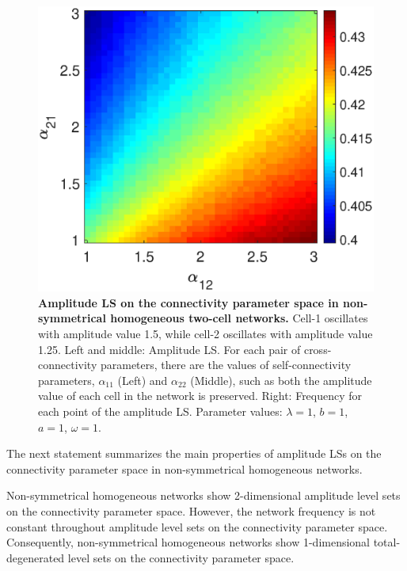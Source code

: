 \begin{figure}[h]
\begin{minipage}{0.32\linewidth}
  \end{minipage} 
   \begin{minipage}{0.32\linewidth}
  \begin{center}
\includegraphics[width=1\linewidth]{Images/photo20_3.eps}
\end{center}

  \end{minipage} 
  
   \caption{\textbf{Amplitude LS on the connectivity parameter space in non-symmetrical homogeneous two-cell networks.} Cell-1 oscillates with amplitude value 1.5, while cell-2 oscillates with amplitude value 1.25. Left and middle: Amplitude LS. For each pair of cross-connectivity parameters, there are the values of self-connectivity parameters, $\alpha_{11}$ (Left) and $\alpha_{22}$ (Middle), such as both the amplitude value of each cell in the network is preserved. Right: Frequency for each point of the amplitude LS. Parameter values: $\lambda = 1$, $b=1$, $a = 1$, $\omega= 1$.}
  \label{photo20}
\end{figure}

The next statement summarizes the main properties of amplitude LSs on the connectivity parameter space in non-symmetrical homogeneous networks.

\begin{Statement}
Non-symmetrical homogeneous networks show 2-dimensional amplitude level sets on the connectivity parameter space. However, the network frequency is not constant throughout amplitude level sets on the connectivity parameter space. Consequently, non-symmetrical homogeneous networks show 1-dimensional total-degenerated level sets on the connectivity parameter space.
\end{Statement}

